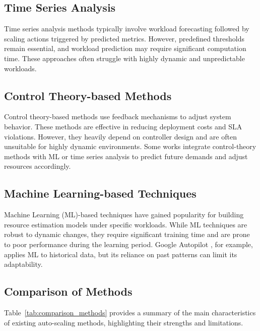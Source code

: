 \documentclass[conference]{IEEEtran}
\begin{document}
\subsection{Time Series Analysis}
Time series analysis methods \cite{calheiros2014arima, messias2016genetic, kumar2018neural} typically involve workload forecasting followed by scaling actions triggered by predicted metrics. However, predefined thresholds remain essential, and workload prediction may require significant computation time. These approaches often struggle with highly dynamic and unpredictable workloads.

\subsection{Control Theory-based Methods}
Control theory-based methods \cite{baresi2016controller, farokhi2016vertical, nouri2019autonomic} use feedback mechanisms to adjust system behavior. These methods are effective in reducing deployment costs and SLA violations. However, they heavily depend on controller design and are often unsuitable for highly dynamic environments. Some works integrate control-theory methods with ML or time series analysis to predict future demands and adjust resources accordingly.

\subsection{Machine Learning-based Techniques}
Machine Learning (ML)-based techniques \cite{rossi2019horizontal, lee2020deep, rzadka2020autopilot, toka2021scaling} have gained popularity for building resource estimation models under specific workloads. While ML techniques are robust to dynamic changes, they require significant training time and are prone to poor performance during the learning period. Google Autopilot \cite{rzadka2020autopilot}, for example, applies ML to historical data, but its reliance on past patterns can limit its adaptability.

\subsection{Comparison of Methods}
Table~\ref{tab:comparison_methods} provides a summary of the main characteristics of existing auto-scaling methods, highlighting their strengths and limitations.
\end{document}
